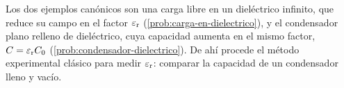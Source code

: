 Los dos ejemplos canónicos son una carga libre en un dieléctrico infinito, que reduce su campo en el factor
$\varepsilon_{\mathrm r}$ (\cref{prob:carga-en-dielectrico}), y el condensador plano relleno de dieléctrico, cuya capacidad
aumenta en el mismo factor, $C=\varepsilon_{\mathrm r} C_0$ (\cref{prob:condensador-dielectrico}). De ahí procede el método
experimental clásico para medir $\varepsilon_{\mathrm r}$: comparar la capacidad de un condensador lleno y vacío.
